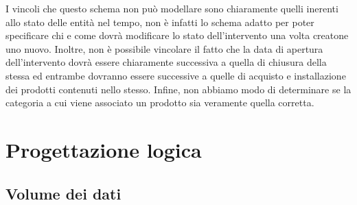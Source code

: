 \documentclass[a4paper, 12pt]{report}
\begin{document}
I vincoli che questo schema non può modellare sono chiaramente quelli inerenti allo stato delle entità nel tempo, non è infatti lo schema adatto per poter
specificare chi e come dovrà modificare lo stato dell'intervento una volta creatone uno nuovo. Inoltre, non è possibile vincolare il fatto che la data di
apertura dell'intervento dovrà essere chiaramente successiva a quella di chiusura della stessa ed entrambe dovranno essere successive a quelle di acquisto e
installazione dei prodotti contenuti nello stesso. Infine, non abbiamo modo di determinare se la categoria a cui viene associato un prodotto sia veramente
quella corretta.

\chapter{Progettazione logica}

\section{Volume dei dati}
\end{document}
